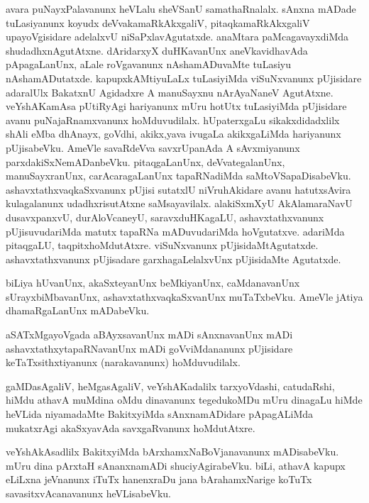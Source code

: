 \documentclass{article}
\begin{document}
\begin{mn}%
avara puNayxPalavanunx heVLalu sheVSanU samathaRnalalx. sAnxna mADade tuLasiyanunx koyudx 
deVvakamaRkAkxgaliV, pitaqkamaRkAkxgaliV upayoVgisidare adelalxvU niSaPxlavAgutatxde. 
anaMtara paMcagavayxdiMda shudadhxnAgutAtxne. dAridarxyX duHKavanUnx aneVkavidhavAda 
pApagaLanUnx, aLale roVgavanunx nAshamADuvaMte tuLasiyu nAshamADutatxde. kapupxkAMtiyuLaLx 
tuLasiyiMda viSuNxvanunx pUjisidare adaralUlx BakatxnU Agidadxre A manuSayxnu nArAyaNaneV 
AgutAtxne. veYshAKamAsa pUtiRyAgi hariyanunx mUru hotUtx tuLasiyiMda pUjisidare avanu 
puNajaRnamxvanunx hoMduvudilalx. hUpaterxgaLu sikakxdidadxlilx shAli eMba dhAnayx, goVdhi, 
akikx,yava ivugaLa akikxgaLiMda hariyanunx pUjisabeVku. AmeVle savaRdeVva savxrUpanAda A 
sAvxmiyanunx parxdakiSxNemADanbeVku. pitaqgaLanUnx, deVvategalanUnx, manuSayxranUnx, 
carAcaragaLanUnx tapaRNadiMda saMtoVSapaDisabeVku. ashavxtathxvaqkaSxvanunx pUjisi 
sutatxlU niVruhAkidare avanu hatutxsAvira kulagalanunx udadhxrisutAtxne saMsayavilalx. 
alakiSxmXyU AkAlamaraNavU dusavxpanxvU, durAloVcaneyU, saravxduHKagaLU, ashavxtathxvanunx 
pUjisuvudariMda matutx tapaRNa mADuvudariMda hoVgutatxve. adariMda pitaqgaLU, 
taqpitxhoMdutAtxre. viSuNxvanunx pUjisidaMtAgutatxde. ashavxtathxvanunx pUjisadare 
garxhagaLelalxvUnx pUjisidaMte Agutatxde.
\end{mn}

\begin{mn}%
biLiya hUvanUnx, akaSxteyanUnx beMkiyanUnx, caMdanavanUnx sUrayxbiMbavanUnx, 
ashavxtathxvaqkaSxvanUnx muTaTxbeVku. AmeVle jAtiya dhamaRgaLanUnx mADabeVku.
\end{mn}

\begin{mn}%
aSATxMgayoVgada aBAyxsavanUnx mADi sAnxnavanUnx mADi ashavxtathxytapaRNavanUnx mADi 
goVviMdananunx pUjisidare keTaTxsithxtiyanunx (narakavanunx) hoMduvudilalx.
\end{mn}

\begin{mn}%
gaMDasAgaliV, heMgasAgaliV, veYshAKadalilx tarxyoVdashi, catudaRshi, hiMdu athavA muMdina 
oMdu dinavanunx tegedukoMDu mUru dinagaLu hiMde heVLida niyamadaMte BakitxyiMda 
sAnxnamADidare pApagALiMda mukatxrAgi akaSxyavAda savxgaRvanunx hoMdutAtxre.
\end{mn}

\begin{mn}%
veYshAkAsadlilx BakitxyiMda bArxhamxNaBoVjanavanunx mADisabeVku. mUru dina pArxtaH 
sAnanxnamADi shuciyAgirabeVku. biLi, athavA kapupx eLiLxna jeVnanunx  iTuTx hanenxraDu 
jana bArahamxNarige koTuTx savasitxvAcanavanunx heVLisabeVku.
\end{mn}
\end{document}
